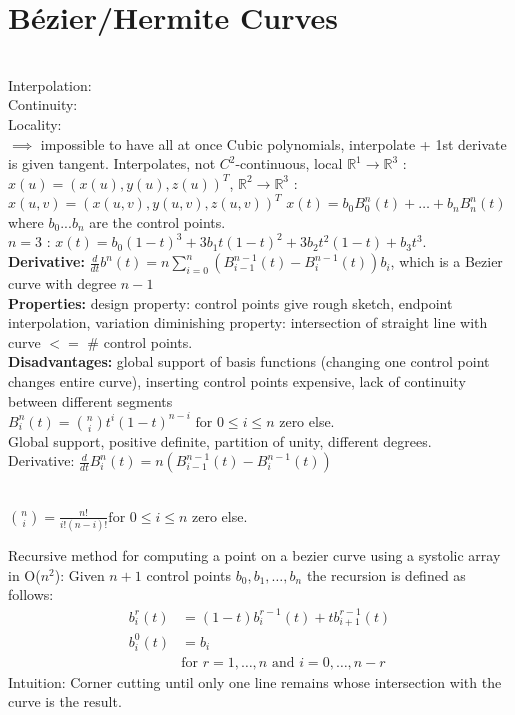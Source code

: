 \section{Bézier/Hermite Curves}
 \\
Interpolation: \\
Continuity: \\
Locality:  \\
$\implies$ impossible to have all at once
Cubic polynomials, interpolate + 1st derivate is given tangent. Interpolates, not $C^2$-continuous, local
 $\mathbb{R}^1 \to \mathbb{R}^3$ : $x(u) = (x(u), y(u), z(u))^T$, $\mathbb{R}^2 \to \mathbb{R}^3$ : $x(u,v) = (x(u,v), y(u,v), z(u,v))^T$
${x}(t) = b_0 B_0^n(t) + \dots + b_n B_n^n(t)$ where $b_0 ...b_n$ are the control points. 
\\
$n = 3 $ : ${x}(t) = b_0(1-t)^3 + 3b_1t(1-t)^2 + 3b_2t^2(1-t) + b_3t^3$. 
\\
\textbf{Derivative:} $\frac{d}{dt} b^n(t) = n \sum_{i=0}^{n} \left( B_{i-1}^{n-1}(t) - B_i^{n-1}(t) \right) b_i$, which is a Bezier curve with degree $n - 1$\\
\textbf{Properties:} design property: control points give rough sketch, endpoint interpolation, variation diminishing property: intersection of straight line with curve $<=$ \# control points.\\
\textbf{Disadvantages:} global support of basis functions (changing one control point changes entire curve), inserting control points expensive, lack of continuity between different segments\\
$B_i^n(t) = \binom{n}{i} t^i (1 - t)^{n-i} \text{ for } 0 \leq i \leq n$ zero else. 
\\
Global support, positive definite, partition of unity, different degrees. 
\\
Derivative: $\frac{d}{dt} B_i^n(t) = n \left( B_{i-1}^{n-1}(t) - B_i^{n-1}(t) \right)$


\\
$\binom{n}{i} = \frac{n!}{i!(n-i)!} \text{for } 0 \leq i \leq n$ zero else.

Recursive method for computing a point on a bezier curve using a systolic array in O($n^2$):
Given \( n+1 \) control points \( b_0, b_1, \ldots, b_n \) the recursion is defined as follows:
\begin{align*}
b_i^r(t) &= (1 - t) b_i^{r-1}(t) + t b_{i+1}^{r-1}(t) \\
b_i^0(t) &= b_i \\
&\text{for } r = 1, \ldots, n \text{ and } i = 0, \ldots, n-r
\end{align*}
Intuition: Corner cutting until only one line remains whose intersection with the curve is the result. 

